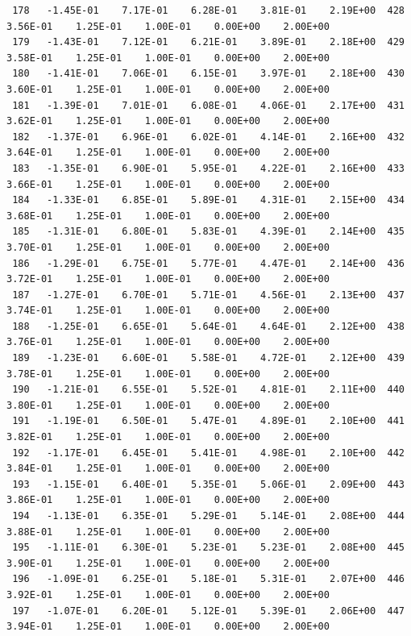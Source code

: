 \documentclass[10pt,letterpaper,notitlepage]{article}
\numberwithin{equation}{section}
\begin{document}
\begin{appendices}
{\begin{verbatim}
 178   -1.45E-01    7.17E-01    6.28E-01    3.81E-01    2.19E+00  428    3.56E-01    1.25E-01    1.00E-01    0.00E+00    2.00E+00
 179   -1.43E-01    7.12E-01    6.21E-01    3.89E-01    2.18E+00  429    3.58E-01    1.25E-01    1.00E-01    0.00E+00    2.00E+00
 180   -1.41E-01    7.06E-01    6.15E-01    3.97E-01    2.18E+00  430    3.60E-01    1.25E-01    1.00E-01    0.00E+00    2.00E+00
 181   -1.39E-01    7.01E-01    6.08E-01    4.06E-01    2.17E+00  431    3.62E-01    1.25E-01    1.00E-01    0.00E+00    2.00E+00
 182   -1.37E-01    6.96E-01    6.02E-01    4.14E-01    2.16E+00  432    3.64E-01    1.25E-01    1.00E-01    0.00E+00    2.00E+00
 183   -1.35E-01    6.90E-01    5.95E-01    4.22E-01    2.16E+00  433    3.66E-01    1.25E-01    1.00E-01    0.00E+00    2.00E+00
 184   -1.33E-01    6.85E-01    5.89E-01    4.31E-01    2.15E+00  434    3.68E-01    1.25E-01    1.00E-01    0.00E+00    2.00E+00
 185   -1.31E-01    6.80E-01    5.83E-01    4.39E-01    2.14E+00  435    3.70E-01    1.25E-01    1.00E-01    0.00E+00    2.00E+00
 186   -1.29E-01    6.75E-01    5.77E-01    4.47E-01    2.14E+00  436    3.72E-01    1.25E-01    1.00E-01    0.00E+00    2.00E+00
 187   -1.27E-01    6.70E-01    5.71E-01    4.56E-01    2.13E+00  437    3.74E-01    1.25E-01    1.00E-01    0.00E+00    2.00E+00
 188   -1.25E-01    6.65E-01    5.64E-01    4.64E-01    2.12E+00  438    3.76E-01    1.25E-01    1.00E-01    0.00E+00    2.00E+00
 189   -1.23E-01    6.60E-01    5.58E-01    4.72E-01    2.12E+00  439    3.78E-01    1.25E-01    1.00E-01    0.00E+00    2.00E+00
 190   -1.21E-01    6.55E-01    5.52E-01    4.81E-01    2.11E+00  440    3.80E-01    1.25E-01    1.00E-01    0.00E+00    2.00E+00
 191   -1.19E-01    6.50E-01    5.47E-01    4.89E-01    2.10E+00  441    3.82E-01    1.25E-01    1.00E-01    0.00E+00    2.00E+00
 192   -1.17E-01    6.45E-01    5.41E-01    4.98E-01    2.10E+00  442    3.84E-01    1.25E-01    1.00E-01    0.00E+00    2.00E+00
 193   -1.15E-01    6.40E-01    5.35E-01    5.06E-01    2.09E+00  443    3.86E-01    1.25E-01    1.00E-01    0.00E+00    2.00E+00
 194   -1.13E-01    6.35E-01    5.29E-01    5.14E-01    2.08E+00  444    3.88E-01    1.25E-01    1.00E-01    0.00E+00    2.00E+00
 195   -1.11E-01    6.30E-01    5.23E-01    5.23E-01    2.08E+00  445    3.90E-01    1.25E-01    1.00E-01    0.00E+00    2.00E+00
 196   -1.09E-01    6.25E-01    5.18E-01    5.31E-01    2.07E+00  446    3.92E-01    1.25E-01    1.00E-01    0.00E+00    2.00E+00
 197   -1.07E-01    6.20E-01    5.12E-01    5.39E-01    2.06E+00  447    3.94E-01    1.25E-01    1.00E-01    0.00E+00    2.00E+00

\end{verbatim}}
\end{appendices}
\end{document}
